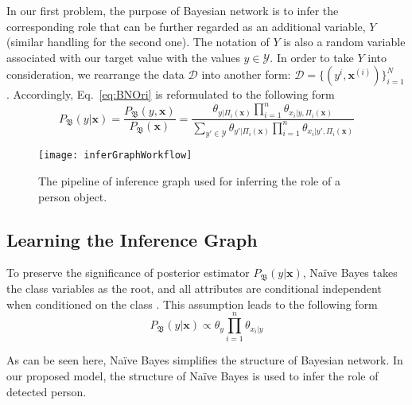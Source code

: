 In our first problem, the purpose of Bayesian network is to infer the corresponding role that can be further regarded as an additional variable, \eg $Y$ (similar handling for the second one). 
The notation of $Y$ is also a random variable associated with our target value with the values $y\in\mathcal{Y}$. 
In order to take $Y$ into consideration, we rearrange the data $\mathcal{D}$ into another form: $\mathcal{D}=\{(y^{i}, \mathbf{x}^{(i)})\}_{i=1}^N$. Accordingly, Eq.~\eqref{eq:BNOri} is reformulated to the following form 
\vspace{-1ex}
\begin{equation}\label{eq:BNWithCls}
P_\mathfrak{B}(y|\mathbf{x}) = \frac{P_\mathfrak{B}(y,\mathbf{x})}{P_\mathfrak{B}(\mathbf{x})}
=\frac{ \theta_{y|\Pi_i(\mathbf{x})} \prod_{i=1}^{n} \theta_{x_i|y, \Pi_i(\mathbf{x})} }{ \sum_{y'\in \mathcal{Y}} \theta_{y'|\Pi_i(\mathbf{x})} \prod_{i=1}^{n} \theta_{x_i|y', \Pi_i(\mathbf{x})} }
\end{equation}
\vspace{-1ex}

\begin{figure}[tb]
\centering
\texttt{[image: inferGraphWorkflow]}
\caption{The pipeline of inference graph used for inferring the role of a person object.}
\vspace{-4ex}
\label{fig:inferGraphWorkflow}
\end{figure}


\subsection{Learning the Inference Graph}
To preserve the significance of posterior estimator $P_\mathfrak{B}(y|\mathbf{x})$, 
Na\"{i}ve Bayes takes the class variables as the root, and all attributes are conditional independent when conditioned on the class \cite{petitjean2018accurate}. This assumption leads to the following form
\vspace{-1ex}
\begin{equation}\label{eq:BN-naiveBayes}
P_\mathfrak{B}(y|\mathbf{x}) \propto \theta_y \prod_{i=1}^{n}\theta_{x_i|y}
\end{equation}
\vspace{-1ex}

As can be seen here, Na\"{i}ve Bayes simplifies the structure of Bayesian network. In our proposed model, the structure of Na\"{i}ve Bayes is used to infer %
the role of detected person.   %



